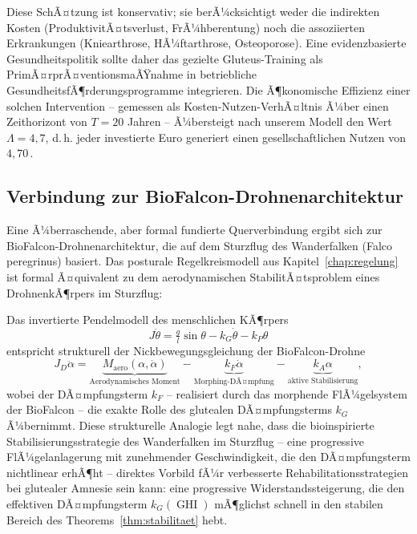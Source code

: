 ﻿\documentclass[12pt,a4paper]{report}
\theoremstyle{plain}
\theoremstyle{definition}
\theoremstyle{remark}
\DeclareMathOperator{\GHI}{GHI}
\newcommand{\euro}{\texteuro}    %
\begin{document}
	Diese SchÃ¤tzung ist konservativ; sie berÃ¼cksichtigt weder die indirekten
	Kosten (ProduktivitÃ¤tsverlust, FrÃ¼hberentung) noch die assoziierten
	Erkrankungen (Kniearthrose, HÃ¼ftarthrose, Osteoporose). Eine evidenzbasierte
	Gesundheitspolitik sollte daher das gezielte Gluteus-Training als
	PrimÃ¤rprÃ¤ventionsmaÃŸnahme in betriebliche GesundheitsfÃ¶rderungs\-programme
	integrieren. Die Ã¶konomische Effizienz einer solchen Intervention --
	gemessen als Kosten-Nutzen-VerhÃ¤ltnis Ã¼ber einen Zeithorizont von
	$T = 20$ Jahren -- Ã¼bersteigt nach unserem Modell den Wert $\Lambda = 4{,}7$,
	d.\,h. jeder investierte Euro generiert einen gesellschaftlichen Nutzen
	von $4{,}70$\,\euro{}.
	
	\subsection{Verbindung zur BioFalcon-Drohnenarchitektur}
	\label{subsec:biofalcon}
	
	Eine Ã¼berraschende, aber formal fundierte Querverbindung ergibt sich
	zur BioFalcon-Drohnenarchitektur, die auf dem Sturzflug des Wanderfalken
	(Falco peregrinus) basiert. Das posturale Regelkreismodell aus
	Kapitel~\ref{chap:regelung} ist formal Ã¤quivalent zu dem
	aerodynamischen StabilitÃ¤tsproblem eines DrohnenkÃ¶rpers im Sturzflug:
	
	Das invertierte Pendelmodell des menschlichen KÃ¶rpers
	\[
	J\ddot\theta = \tfrac{g}{l}\sin\theta - k_G\dot\theta - k_P\theta
	\]
	entspricht strukturell der Nickbewegungsgleichung der BioFalcon-Drohne
	\[
	J_D\ddot\alpha = \underbrace{M_{\mathrm{aero}}(\alpha, \dot\alpha)}_{\text{Aerodynamisches Moment}}
	- \underbrace{k_F\dot\alpha}_{\text{Morphing-DÃ¤mpfung}} - \underbrace{k_A\alpha}_{\text{aktive Stabilisierung}},
	\]
	wobei der DÃ¤mpfungsterm $k_F$ -- realisiert durch das morphende FlÃ¼gelsystem
	der BioFalcon -- die exakte Rolle des glutealen DÃ¤mpfungsterms $k_G$
	Ã¼bernimmt. Diese strukturelle Analogie legt nahe, dass die bioinspirierte
	Stabilisierungsstrategie des Wanderfalken im Sturzflug -- eine progressive
	FlÃ¼gelanlagerung mit zunehmender Geschwindigkeit, die den DÃ¤mpfungsterm
	nichtlinear erhÃ¶ht -- direktes Vorbild fÃ¼r verbesserte Rehabilitationsstrategien
	bei glutealer Amnesie sein kann: eine progressive Widerstandssteigerung,
	die den effektiven DÃ¤mpfungsterm $k_G(\GHI)$ mÃ¶glichst schnell in den
	stabilen Bereich des Theorems~\ref{thm:stabilitaet} hebt.
	
\end{document}
